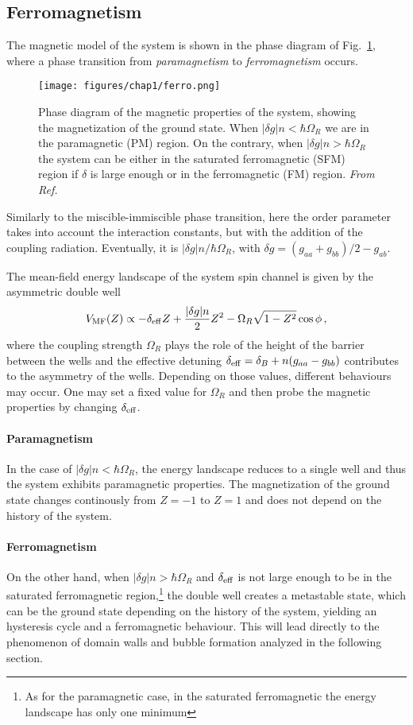 \subsection{Ferromagnetism}
The magnetic model of the system is shown in the phase diagram of Fig.\ \ref{fig:ferro}, where a phase transition from \textit{paramagnetism} to \textit{ferromagnetism} occurs.
\begin{figure}[h!]
    \centering
    \texttt{[image: figures/chap1/ferro.png]}
    \caption{Phase diagram of the magnetic properties of the system, showing the magnetization of the ground state. When $|\delta g|n < \hbar\Omega_R$ we are in the paramagnetic (PM) region. On the contrary, when $|\delta g|n > \hbar\Omega_R$ the system can be either in the saturated ferromagnetic (SFM) region if $\delta$ is large enough or in the ferromagnetic (FM) region. \textit{From Ref. \cite{cominotti2023ferro}}}
    \label{fig:ferro}
\end{figure}
Similarly to the miscible-immiscible phase transition, here the order parameter takes into account the interaction constants, but with the addition of the coupling radiation. Eventually, it is $|\delta g|n/\hbar\Omega_R$, with $\delta g = (g_{aa}+g_{bb})/2 - g_{ab}$.

The mean-field energy landscape of the system spin channel is given by the asymmetric double well
\begin{equation}
    V_{\rm MF}(Z) \propto -\delta_{\rm eff} Z + \frac{|\delta g|n}{2}Z^2 - \Omega_R \sqrt{1-Z^2}\cos\phi\, ,
    \label{eq:V_MF}
\end{equation}
where the coupling strength $\Omega_R$ plays the role of the height of the barrier between the wells and the effective detuning $\delta_{\rm eff} = \delta_B + n(g_{aa}-g_{bb})$ contributes to the asymmetry of the wells. Depending on those values, different behaviours may occur. One may set a fixed value for $\Omega_R$ and then probe the magnetic properties by changing $\delta_{\rm eff}$.

\paragraph{Paramagnetism}
In the case of $|\delta g|n < \hbar\Omega_R$, the energy landscape reduces to a single well and thus the system exhibits paramagnetic properties. The magnetization of the ground state changes continously from $Z=-1$ to $Z=1$ and does not depend on the history of the system. 

\paragraph{Ferromagnetism}
On the other hand, when $|\delta g|n > \hbar\Omega_R$ and $\delta_{\rm eff}$ is not large enough to be in the saturated ferromagnetic region,\footnote{As for the paramagnetic case, in the saturated ferromagnetic the energy landscape has only one minimum} the double well creates a metastable state, which can be the ground state depending on the history of the system, yielding an hysteresis cycle and a ferromagnetic behaviour. This will lead directly to the phenomenon of domain walls and bubble formation analyzed in the following section.


